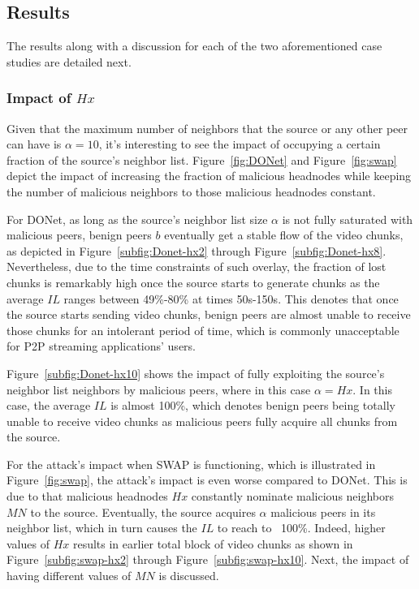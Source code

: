 \subsection{Results}

The results along with a discussion for each of the two aforementioned case studies are detailed next.

\subsubsection{Impact of $Hx$}
Given that the maximum number of neighbors that the source or any other peer can have is $\alpha =10$, it's interesting to see the impact of occupying a certain fraction of the source's neighbor list.
Figure~\ref{fig:DONet} and Figure~\ref{fig:swap} depict the impact of increasing the fraction of malicious headnodes while keeping the number of malicious neighbors to those malicious headnodes constant.

For DONet, as long as the source's neighbor list size $\alpha$ is not fully saturated with malicious peers, benign peers $b$ eventually get a stable flow of the video chunks, as depicted in Figure~\ref{subfig:Donet-hx2} through Figure~\ref{subfig:Donet-hx8}.
Nevertheless, due to the time constraints of such overlay, the fraction of lost chunks is remarkably high once the source starts to generate chunks as the average $IL$ ranges between 49\%-80\% at times 50s-150s. 
This denotes that once the source starts sending video chunks, benign peers are almost unable to receive those chunks for an intolerant period of time, which is commonly unacceptable for P2P streaming applications' users.

Figure~\ref{subfig:Donet-hx10} shows the impact of fully exploiting the source's neighbor list neighbors by malicious peers, where in this case $\alpha = Hx$.
In this case, the average $IL$ is almost 100\%, which denotes benign peers being totally unable to receive video chunks as malicious peers fully acquire all chunks from the source.

For the attack's impact when SWAP is functioning, which is illustrated in Figure~\ref{fig:swap}, the attack's impact is even worse compared to DONet.
This is due to that malicious headnodes $Hx$ constantly nominate malicious neighbors $MN$ to the source.
Eventually, the source acquires $\alpha$ malicious peers in its neighbor list, which in turn causes the $IL$ to reach to ~100\%.
Indeed, higher values of $Hx$ results in earlier total block of video chunks as shown in Figure~\ref{subfig:swap-hx2} through Figure~\ref{subfig:swap-hx10}.
Next, the impact of having different values of $MN$ is discussed.

